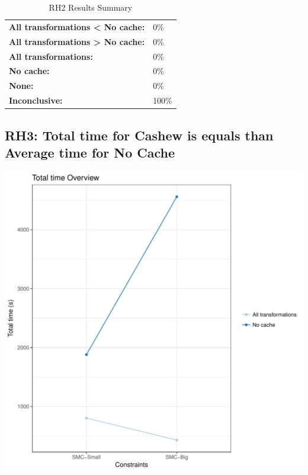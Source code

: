 \documentclass{article}\usepackage[]{graphicx}\usepackage[]{color}
\makeatletter
\def\maxwidth{ %
  \ifdim\Gin@nat@width>\linewidth
    \linewidth
  \else
    \Gin@nat@width
  \fi
}
\newenvironment{knitrout}{}{} %
\makeatother
\begin{document}
	\begin{table}[H]
	\centering
	\caption{RH2 Results Summary}
	\begin{tabular}{ll}
	\textbf{All transformations \textless{} No cache:}& 0\% \\
	\textbf{All transformations \textgreater{} No cache:}& 0\%\\
	\textbf{All transformations:} & 0\%\\
	\textbf{No cache:} & 0\%\\
	\textbf{None:}& 0\%\\
	\textbf{Inconclusive:}& 100\%
			
	
	\end{tabular}
	\end{table}
	
	
	



\subsection{RH3: Total time for Cashew is equals than Average time for No Cache}


 
\begin{knitrout}
\color{fgcolor}
\includegraphics[width=\maxwidth]{figure/overview_RH3-1} 

\end{knitrout}
 	
\end{document}
